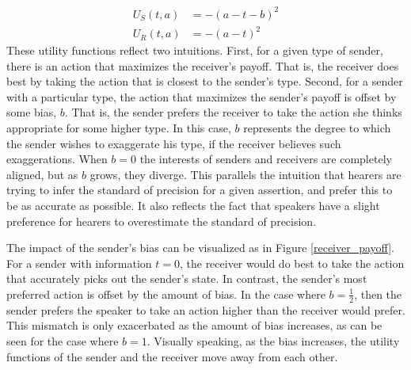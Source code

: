 \documentclass[12pt]{article}
\theoremstyle{definition} \newtheorem{definition}{Definition}
\begin{document}
\begin{equation}
\begin{split}
     U_S(t, a) &= -(a - t - b)^2\\
  	 U_R(t, a) &= -(a - t)^2
\end{split}
\end{equation}
These utility functions reflect two intuitions. First, for a given type of sender, there is an action that maximizes the receiver's payoff. That is, the receiver does best by taking the action that is closest to the sender's type. Second, for a sender with a particular type, the action that maximizes the sender's payoff is offset by some bias, $b$. That is, the sender prefers the receiver to take the action she thinks appropriate for some higher type. In this case, $b$ represents the degree to which the sender wishes to exaggerate his type, if the receiver believes such exaggerations. When $b=0$ the interests of senders and receivers are completely aligned, but as $b$ grows, they diverge. This parallels the intuition that hearers are trying to infer the standard of precision for a given assertion, and prefer this to be as accurate as possible. It also reflects the fact that speakers have a slight preference for hearers to overestimate the standard of precision.

The impact of the sender's bias can be visualized as in Figure \ref{receiver_payoff}. For a sender with information $t=0$, the receiver would do best to take the action that accurately picks out the sender's state. In contrast, the sender's most preferred action is offset by the amount of bias. In the case where $b=\frac{1}{2}$, then the sender prefers the speaker to take an action higher than the receiver would prefer. This mismatch is only exacerbated as the amount of bias increases, as can be seen for the case where $b=1$. Visually speaking, as the bias increases, the utility functions of the sender and the receiver move away from each other. 
\end{document}
